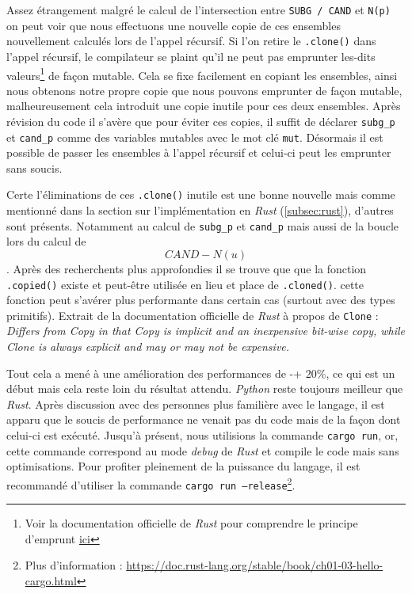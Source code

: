\documentclass[12pt,a4paper]{article}
\begin{document}
Assez étrangement malgré le calcul de l'intersection entre \texttt{SUBG / CAND} et \texttt{N(p)} on peut voir que nous effectuons une nouvelle copie de ces ensembles nouvellement calculés lors de l'appel récursif. Si l'on retire le \texttt{.clone()} dans l'appel récursif, le compilateur se plaint qu'il ne peut pas emprunter les-dits valeurs\footnote{Voir la documentation officielle de \emph{Rust} pour comprendre le principe d'emprunt \href{https://doc.rust-lang.org/stable/book/ch04-00-understanding-ownership.html}{ici}} de façon mutable. Cela se fixe facilement en copiant les ensembles, ainsi nous obtenons notre propre copie que nous pouvons emprunter de façon mutable, malheureusement cela introduit une copie inutile pour ces deux ensembles.
Après révision du code il s'avère que pour éviter ces copies, il suffit de déclarer \texttt{subg\_p} et \texttt{cand\_p} comme des variables mutables avec le mot clé \texttt{mut}. Désormais il est possible de passer les ensembles à l'appel récursif et celui-ci peut les emprunter sans soucis.

Certe l'éliminations de ces \texttt{.clone()} inutile est une bonne nouvelle mais comme mentionné dans la section sur l'implémentation en \emph{Rust} (\ref{subsec:rust}), d'autres sont présents. Notamment au calcul de \texttt{subg\_p} et \texttt{cand\_p} mais aussi de la boucle lors du calcul de \[ CAND - N(u) \]. Après des recherchents plus approfondies il se trouve que que la fonction \texttt{.copied()} existe et peut-être utilisée en lieu et place de \texttt{.cloned()}. cette fonction peut s'avérer plus performante dans certain cas (surtout avec des types primitifs). Extrait de la documentation officielle de \emph{Rust} à propos de \texttt{Clone} : \textit{\guillemotleft Differs from Copy in that Copy is implicit and an inexpensive bit-wise copy, while Clone is always explicit and may or may not be expensive. \guillemotright}

Tout cela a mené à une amélioration des performances de -+ 20\%, ce qui est un début mais cela reste loin du résultat attendu. \emph{Python} reste toujours meilleur que \emph{Rust}. Après discussion avec des personnes plus familière avec le langage, il est apparu que le soucis de performance ne venait pas du code mais de la façon dont celui-ci est exécuté. Jusqu'à présent, nous utilisions la commande \texttt{cargo run}, or, cette commande correspond au mode \emph{debug} de \emph{Rust} et compile le code mais sans optimisations. Pour profiter pleinement de la puissance du langage, il est recommandé d'utiliser la commande \texttt{cargo run --release}\footnote{Plus d'information : \url{https://doc.rust-lang.org/stable/book/ch01-03-hello-cargo.html}}.
\end{document}
